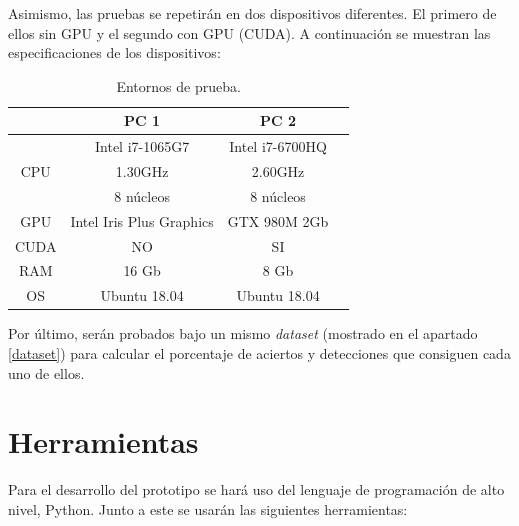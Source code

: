 Asimismo, las pruebas se repetirán en dos dispositivos diferentes. El primero de ellos sin GPU y el segundo con GPU (CUDA). A continuación se muestran las especificaciones de los dispositivos:

\begin{table}[h!]
	\begin{center}
		\begin{tabular}{ |c|c|c|c| } 
			\hline
			 & PC 1 & PC 2 \\
			\hline
			\multirow{3}{4em}{CPU} & Intel i7-1065G7 & Intel i7-6700HQ \\ 
			& 1.30GHz & 2.60GHz \\ 
			& 8 núcleos & 8 núcleos \\ 
			\hline
			GPU & Intel Iris Plus Graphics  & GTX 980M 2Gb \\
			\hline
			CUDA & NO  & SI \\
			\hline
			RAM & 16 Gb & 8 Gb \\
			\hline
			OS & Ubuntu 18.04 & Ubuntu 18.04 \\
			\hline
		\end{tabular}
		\caption{Entornos de prueba.}
		\label{tab:table1}
	\end{center}
\end{table}

Por último, serán probados bajo un mismo \textit{dataset} (mostrado en el apartado \ref{dataset}) para calcular el porcentaje de aciertos y detecciones que consiguen cada uno de ellos.

\vspace{-0.9cm}
\section*{Herramientas}
\vspace{-0.5cm}

Para el desarrollo del prototipo se hará uso del lenguaje de programación de alto nivel, Python. Junto a este se usarán las siguientes herramientas:

